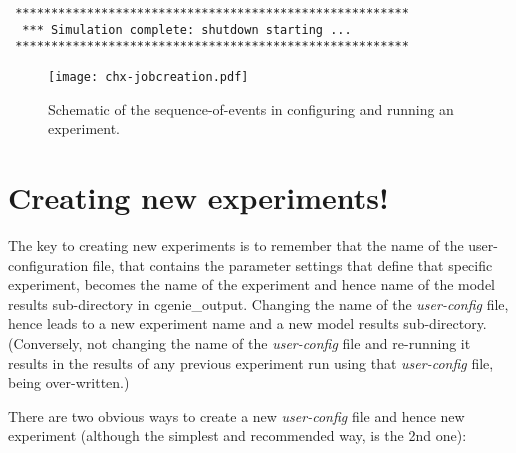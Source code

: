 \documentclass[11pt,fleqn]{book} %
\begin{document}
\begin{verbatim}
 *******************************************************
  *** Simulation complete: shutdown starting ...
 *******************************************************

\end{verbatim}
\normalsize

\begin{figure}
\texttt{[image: chx-jobcreation.pdf]}\centering
\vspace{-0mm}
\caption{Schematic of the sequence-of-events in configuring and running an experiment.}
\label{fig:chx-jobcreation}
\end{figure}


\newpage


\section{Creating new experiments!}

The key to creating new experiments is to remember that the name of the user-configuration file, that contains the parameter settings that define that specific experiment, becomes the name of the experiment and hence name of the model results sub-directory in \textsf{\footnotesize cgenie\_output}. Changing the name of the \textit{user-config} file, hence leads to a new experiment name and a new model results sub-directory. (Conversely, not changing the name of the  \textit{user-config} file and re-running it results in the results of any previous experiment run using that \textit{user-config} file, being over-written.)

There are two obvious ways to create a new \textit{user-config} file and hence new experiment (although the simplest and recommended way, is the 2nd one):
\end{document}
